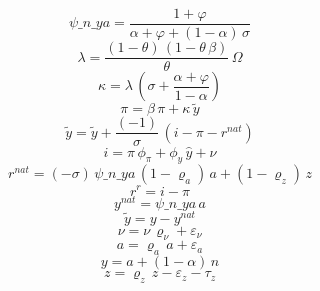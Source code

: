 \documentclass[12pt]{article}
\newcommand{\1}{\mathbbm 1}
\renewcommand{\rho}{\varrho}
\begin{document}
\begin{equation*}
	\psi\_n\_ya = \frac{1+{{\varphi}}}{{{\alpha}}+{{\varphi}}+\left(1-{{\alpha}}\right)\, {{\sigma}}}
\end{equation*}
\begin{equation*}
	\lambda = \frac{\left(1-{{\theta}}\right)\, \left(1-{{\theta}}\, {{\beta}}\right)}{{{\theta}}}\, {\Omega}
\end{equation*}
\begin{equation*}
	\kappa = {\lambda}\, \left({{\sigma}}+\frac{{{\alpha}}+{{\varphi}}}{1-{{\alpha}}}\right)
\end{equation*}
\begin{equation*}
	{{\pi}}={{\beta}}\, {{\pi}}+{\kappa}\, {{\tilde y}}
\end{equation*}
\begin{equation*}
	{{\tilde y}}={{\tilde y}}+\frac{\left(-1\right)}{{{\sigma}}}\, \left({{i}}-{{\pi}}-{{r^{nat}}}\right)
\end{equation*}
\begin{equation*}
	{{i}}={{\pi}}\, {{\phi_{\pi}}}+{{\phi_{y}}}\, {{\hat y}}+{{\nu}}
\end{equation*}
\begin{equation*}
	{{r^{nat}}}=\left(-{{\sigma}}\right)\, {\psi\_n\_ya}\, \left(1-{{\rho_a}}\right)\, {{a}}+\left(1-{{\rho_{z}}}\right)\, {{z}}
\end{equation*}
\begin{equation*}
	{{r^r}}={{i}}-{{\pi}}
\end{equation*}
\begin{equation*}
	{{y^{nat}}}={\psi\_n\_ya}\, {{a}}
\end{equation*}
\begin{equation*}
	{{\tilde y}}={{y}}-{{y^{nat}}}
\end{equation*}
\begin{equation*}
	{{\nu}}={{\nu}}\, {{\rho_{\nu}}}+{{\varepsilon_\nu}}
\end{equation*}
\begin{equation*}
	{{a}}={{\rho_a}}\, {{a}}+{{\varepsilon_a}}
\end{equation*}
\begin{equation*}
	{{y}}={{a}}+\left(1-{{\alpha}}\right)\, {{n}}
\end{equation*}
\begin{equation*}
	{{z}}={{\rho_{z}}}\, {{z}}-{{\varepsilon_z}}-{{\tau_z}}
\end{equation*}
\end{document}
